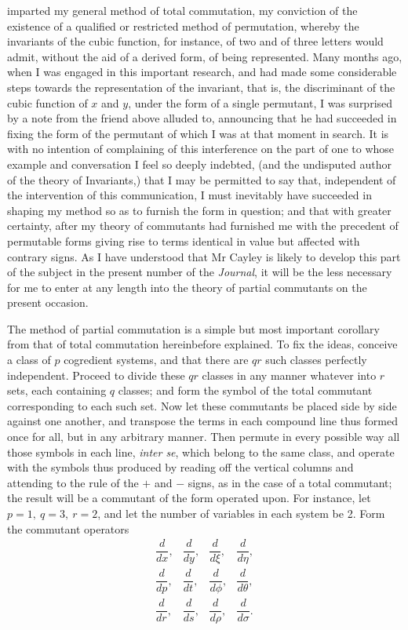 \documentclass[11pt]{article}
\newcommand{\sourcepage}[1]{\marginpar{\scriptsize p.~#1}}
\begin{document}
\sourcepage{318}
imparted my general method of total commutation, my conviction of the existence of a qualified or restricted method of permutation, whereby the invariants of the cubic function, for instance, of two and of three letters would admit, without the aid of a derived form, of being represented. Many months ago, when I was engaged in this important research, and had made some considerable steps towards the representation of the invariant, that is, the discriminant of the cubic function of $x$ and $y$, under the form of a single permutant, I was surprised by a note from the friend above alluded to, announcing that he had succeeded in fixing the form of the permutant of which I was at that moment in search. It is with no intention of complaining of this interference on the part of one to whose example and conversation I feel so deeply indebted, (and the undisputed author of the theory of Invariants,) that I may be permitted to say that, independent of the intervention of this communication, I must inevitably have succeeded in shaping my method so as to furnish the form in question; and that with greater certainty, after my theory of commutants had furnished me with the precedent of permutable forms giving rise to terms identical in value but affected with contrary signs. As I have understood that Mr Cayley is likely to develop this part of the subject in the present number of the \emph{Journal}, it will be the less necessary for me to enter at any length into the theory of partial commutants on the present occasion.

The method of partial commutation is a simple but most important corollary from that of total commutation hereinbefore explained. To fix the ideas, conceive a class of $p$ cogredient systems, and that there are $qr$ such classes perfectly independent. Proceed to divide these $qr$ classes in any manner whatever into $r$ sets, each containing $q$ classes; and form the symbol of the total commutant corresponding to each such set. Now let these commutants be placed side by side against one another, and transpose the terms in each compound line thus formed once for all, but in any arbitrary manner. Then permute in every possible way all those symbols in each line, \emph{inter se}, which belong to the same class, and operate with the symbols thus produced by reading off the vertical columns and attending to the rule of the $+$ and $-$ signs, as in the case of a total commutant; the result will be a commutant of the form operated upon. For instance, let $p=1,\ q=3,\ r=2$, and let the number of variables in each system be 2. Form the commutant operators
\[
\begin{array}{cc|cc}
\dfrac{d}{dx},&\dfrac{d}{dy},&\dfrac{d}{d\xi},&\dfrac{d}{d\eta},\\[0.6em]
\dfrac{d}{dp},&\dfrac{d}{dt},&\dfrac{d}{d\phi},&\dfrac{d}{d\theta},\\[0.6em]
\dfrac{d}{dr},&\dfrac{d}{ds},&\dfrac{d}{d\rho},&\dfrac{d}{d\sigma}.
\end{array}
\]
\end{document}
